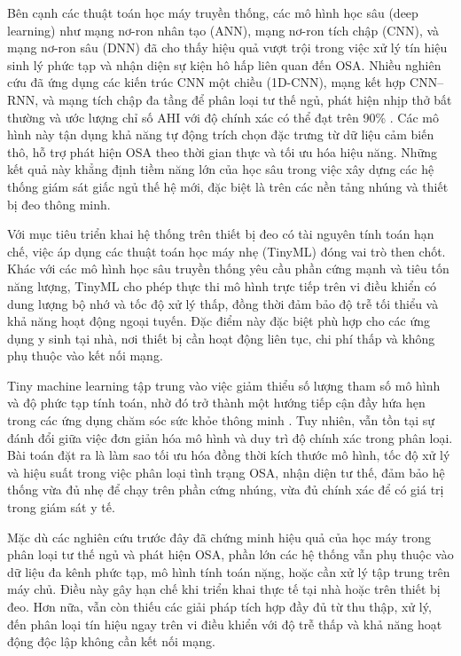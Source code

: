 Bên cạnh các thuật toán học máy truyền thống, các mô hình học sâu (deep
learning) như mạng nơ-ron nhân tạo (ANN), mạng nơ-ron tích chập (CNN), và mạng
nơ-ron sâu (DNN) đã cho thấy hiệu quả vượt trội trong việc xử lý tín hiệu sinh
lý phức tạp và nhận diện sự kiện hô hấp liên quan đến OSA. Nhiều nghiên cứu đã
ứng dụng các kiến trúc CNN một chiều (1D-CNN), mạng kết hợp CNN–RNN, và mạng
tích chập đa tầng để phân loại tư thế ngủ, phát hiện nhịp thở bất thường và ước
lượng chỉ số AHI với độ chính xác có thể đạt trên 90\%
\cite{Vu2025SleepPosition,HOANG2025116309,Sleep_Posture_Detection}. Các mô hình
này tận dụng khả năng tự động trích chọn đặc trưng từ dữ liệu cảm biến thô, hỗ
trợ phát hiện OSA theo thời gian thực và tối ưu hóa hiệu năng. Những kết quả
này khẳng định tiềm năng lớn của học sâu trong việc xây dựng các hệ thống giám
sát giấc ngủ thế hệ mới, đặc biệt là trên các nền tảng nhúng và thiết bị đeo
thông minh.

Với mục tiêu triển khai hệ thống trên thiết bị đeo có tài nguyên tính toán hạn
chế, việc áp dụng các thuật toán học máy nhẹ (TinyML) đóng vai trò then chốt.
Khác với các mô hình học sâu truyền thống yêu cầu phần cứng mạnh và tiêu tốn
năng lượng, TinyML cho phép thực thi mô hình trực tiếp trên vi điều khiển có
dung lượng bộ nhớ và tốc độ xử lý thấp, đồng thời đảm bảo độ trễ tối thiểu và
khả năng hoạt động ngoại tuyến. Đặc điểm này đặc biệt phù hợp cho các ứng dụng
y sinh tại nhà, nơi thiết bị cần hoạt động liên tục, chi phí thấp và không phụ
thuộc vào kết nối mạng.

Tiny machine learning tập trung vào việc giảm thiểu số lượng tham số mô hình và
độ phức tạp tính toán, nhờ đó trở thành một hướng tiếp cận đầy hứa hẹn trong
các ứng dụng chăm sóc sức khỏe thông minh
\cite{ray2021tinyml,diab2022embedded}. Tuy nhiên, vẫn tồn tại sự đánh đổi giữa
việc đơn giản hóa mô hình và duy trì độ chính xác trong phân loại. Bài toán đặt
ra là làm sao tối ưu hóa đồng thời kích thước mô hình, tốc độ xử lý và hiệu
suất trong việc phân loại tình trạng OSA, nhận diện tư thế, đảm bảo hệ thống
vừa đủ nhẹ để chạy trên phần cứng nhúng, vừa đủ chính xác để có giá trị trong
giám sát y tế.

Mặc dù các nghiên cứu trước đây đã chứng minh hiệu quả của học máy trong phân
loại tư thế ngủ và phát hiện OSA, phần lớn các hệ thống vẫn phụ thuộc vào dữ
liệu đa kênh phức tạp, mô hình tính toán nặng, hoặc cần xử lý tập trung trên
máy chủ. Điều này gây hạn chế khi triển khai thực tế tại nhà hoặc trên thiết bị
đeo. Hơn nữa, vẫn còn thiếu các giải pháp tích hợp đầy đủ từ thu thập, xử lý,
đến phân loại tín hiệu ngay trên vi điều khiển với độ trễ thấp và khả năng hoạt
động độc lập không cần kết nối mạng.

